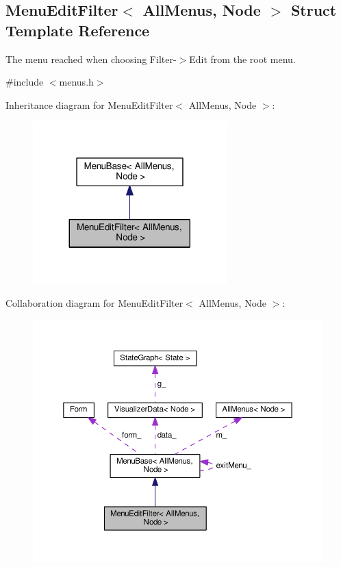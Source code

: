 \hypertarget{structMenuEditFilter}{}\subsection{Menu\+Edit\+Filter$<$ All\+Menus, Node $>$ Struct Template Reference}
\label{structMenuEditFilter}


The menu reached when choosing Filter-\/$>$Edit from the root menu.  




{\ttfamily \#include $<$menus.\+h$>$}



Inheritance diagram for Menu\+Edit\+Filter$<$ All\+Menus, Node $>$\+:\nopagebreak
\begin{figure}[H]
\begin{center}
\leavevmode
\includegraphics[width=212pt]{structMenuEditFilter__inherit__graph}
\end{center}
\end{figure}


Collaboration diagram for Menu\+Edit\+Filter$<$ All\+Menus, Node $>$\+:\nopagebreak
\begin{figure}[H]
\begin{center}
\leavevmode
\includegraphics[width=350pt]{structMenuEditFilter__coll__graph}
\end{center}
\end{figure}
